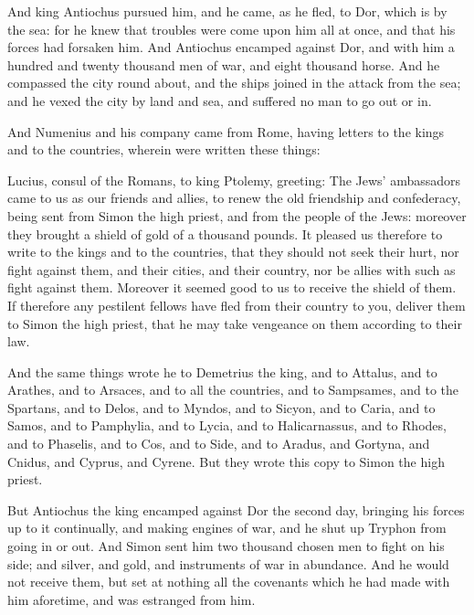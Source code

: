 {And king Antiochus pursued him, and
 he came, as he fled, to Dor, which is by the sea:
for he knew that troubles were come upon him all at once, and that his forces had forsaken him.
And Antiochus encamped against Dor, and with him a hundred and twenty thousand men of war, and eight thousand horse.
And he compassed the city round about, and the ships joined in the attack from the sea; and he vexed the city by land and sea, and suffered no man to go out or in.
\par }{\PP {}And Numenius and his company came from Rome, having letters to the kings and to the countries, wherein were written these things:
\par }{\PP {}Lucius, consul of the Romans, to king Ptolemy, greeting:
The Jews’ ambassadors came to us as our friends and allies, to renew the old friendship and confederacy, being sent from Simon the high priest, and from the people of the Jews:
moreover they brought a shield of gold of a thousand pounds.
It pleased us therefore to write to the kings and to the countries, that they should not seek their hurt, nor fight against them, and their cities, and their country, nor be allies with such as fight against them.
Moreover it seemed good to us to receive the shield of them.
If therefore any pestilent fellows have fled from their country to you, deliver them to Simon the high priest, that he may take vengeance on them according to their law.
\par }{\PP {}And the same things wrote he to Demetrius the king, and to Attalus, and to Arathes, and to Arsaces,
and to all the countries, and to
 Sampsames, and to the Spartans, and to Delos, and to Myndos, and to Sicyon, and to Caria, and to Samos, and to Pamphylia, and to Lycia, and to Halicarnassus, and to Rhodes, and to Phaselis, and to Cos, and to Side, and to Aradus, and Gortyna, and Cnidus, and Cyprus, and Cyrene.
But they wrote this copy to Simon the high priest.
\par }{\PP {}But Antiochus the king encamped against Dor the second day, bringing his forces up to it continually, and making engines of war, and he shut up Tryphon from going in or out.
And Simon sent him two thousand chosen men to fight on his side; and silver, and gold, and instruments of war in abundance.
And he would not receive them, but set at nothing all the covenants which he had made with him aforetime, and was estranged from him.
}
